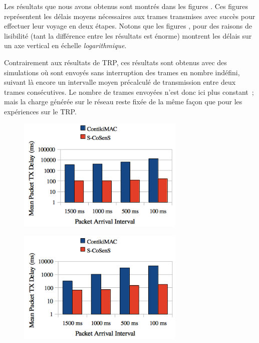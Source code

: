 Les résultats que nous avons obtenus sont montrés dans les figures
.
Ces figures représentent les délais moyens nécessaires aux trames
transmises avec succès pour effectuer leur voyage en deux étapes. Notons que
les figures , pour des
raisons de lisibilité (tant la différence entre les résultats est énorme)
montrent les délais sur un axe vertical en échelle \emph{logarithmique}.

Contrairement aux résultats de TRP, ces résultats sont obtenus avec des
simulations où sont envoyés sans interruption des trames en nombre
indéfini, suivant là encore un intervalle moyen précalculé de transmission
entre deux trames consécutives. Le nombre de trames envoyées n'est donc
ici plus constant~; mais la charge générée sur le réseau reste fixée
de la même façon que pour les expériences sur le TRP.

\begin{figure}[htb]
\centering
\includegraphics[width=8cm]{images/ch5-delays-8hz.png}
\label{FigComparDelais8Hz}
\end{figure}

\begin{figure}[htb]
\centering
\includegraphics[width=8cm]{images/ch5-delays-16hz.png}
\label{FigComparDelais16Hz}
\end{figure}


